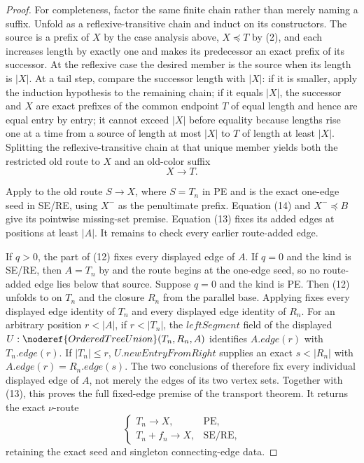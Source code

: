 \begin{proof}
For completeness, factor the same finite chain rather than merely naming
a suffix.  Unfold
 as a reflexive-transitive chain
and induct on its constructors.  The source is a prefix of \(X\) by the
case analysis above, \(X\preccurlyeq T\) by (2), and each
 increases length by exactly one and makes
its predecessor an exact prefix of its successor.  At the reflexive case
the desired member is the source when its length is \(|X|\).  At a tail
step, compare the successor length with \(|X|\): if it is smaller, apply
the induction hypothesis to the remaining chain; if it equals \(|X|\),
the successor and \(X\) are exact prefixes of the common endpoint \(T\)
of equal length and hence are equal entry by entry; it cannot exceed
\(|X|\) before equality because lengths rise one at a time from a source
of length at most \(|X|\) to \(T\) of length at least \(|X|\).  Splitting
the reflexive-transitive chain at that unique member yields both the
restricted old route to \(X\) and an old-color suffix
\[
                              X\longrightarrow T.             \tag{16}
\]

Apply  to the old
route \(S\to X\), where \(S=T_n\) in PE and is the exact one-edge seed in
SE/RE, using \(X^-\) as the penultimate prefix.  Equation (14) and
\(X^-\preccurlyeq B\) give its pointwise missing-set premise.  Equation
(13) fixes its added edges at positions at least \(|A|\).  It remains to
check every earlier route-added edge.

If \(q>0\), the  part of (12) fixes every
displayed edge of \(A\).  If \(q=0\) and the kind is SE/RE, then
\(A=T_n\) by  and the route begins at the one-edge
seed, so no route-added edge lies below that source.  Suppose \(q=0\) and
the kind is PE.  Then (12) unfolds to
 on \(T_n\) and the closure \(R_n\) from
the parallel base.  Applying
 fixes every displayed edge
identity of \(T_n\) and every displayed edge identity of \(R_n\).
For an arbitrary position \(r<|A|\), if \(r<|T_n|\), the
\(\mathit{leftSegment}\) field of the displayed
\(U:\noderef{OrderedTreeUnion}(T_n,R_n,A)\) identifies
\(A.\mathit{edge}(r)\) with \(T_n.\mathit{edge}(r)\).  If
\(|T_n|\le r\), \(U.\mathit{newEntryFromRight}\) supplies an exact
\(s<|R_n|\) with
\(A.\mathit{edge}(r)=R_n.\mathit{edge}(s)\).  The two conclusions of
 therefore fix every individual
displayed edge of \(A\), not merely the edges of its two vertex sets.
Together with (13), this proves the full fixed-edge premise of the
transport theorem.  It returns the exact \(\nu\)-route
\[
 \begin{cases}T_n\longrightarrow X,&\text{PE},\\
 T_n+f_n\longrightarrow X,&\text{SE/RE},\end{cases}           \tag{17}
\]
retaining the exact seed and singleton connecting-edge data.


\end{proof}
